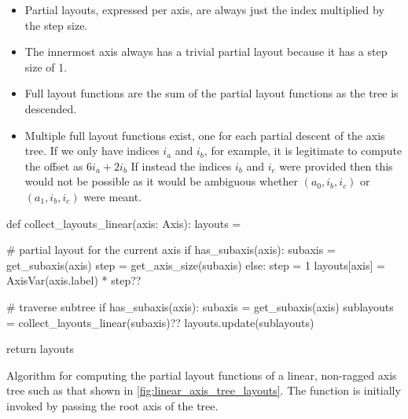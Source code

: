 \documentclass[thesis]{subfiles}
\begin{document}
\begin{itemize}
  \item
    Partial layouts, expressed per axis, are always just the index multiplied by the step size.

  \item
    The innermost axis always has a trivial partial layout because it has a step size of 1.

  \item
    Full layout functions are the sum of the partial layout functions as the tree is descended.

  \item
    Multiple full layout functions exist, one for each partial descent of the axis tree.
    If we only have indices $i_a$ and $i_b$, for example, it is legitimate to compute the offset as $6i_a+2i_b$
    If instead the indices $i_b$ and $i_c$ were provided then this would not be possible as it would be ambiguous whether $(a_0, i_b, i_c)$ or $(a_1, i_b, i_c)$ were meant.
\end{itemize}

\begin{algorithm}
  \begin{center}
    \begin{minipage}{.9\textwidth}
      \begin{pyalg2}
        def collect_layouts_linear(axis: Axis):
          layouts = {}

          # partial layout for the current axis
          if has_subaxis(axis):
            subaxis = get_subaxis(axis)
            step = get_axis_size(subaxis)
          else:
            step = 1
          layouts[axis] = AxisVar(axis.label) * step?\label{code:linear_layout}?

          # traverse subtree
          if has_subaxis(axis): 
            subaxis = get_subaxis(axis)
            sublayouts = collect_layouts_linear(subaxis)?\label{code:linear_sublayouts}?
            layouts.update(sublayouts)

          return layouts
      \end{pyalg2}
    \end{minipage}
  \end{center}

  \caption{
    Algorithm for computing the partial layout functions of a linear, non-ragged axis tree such as that shown in \cref{fig:linear_axis_tree_layouts}.
    The function is initially invoked by passing the root axis of the tree.
  }
  \label{alg:collect_layouts_linear}
\end{algorithm}
\end{document}
